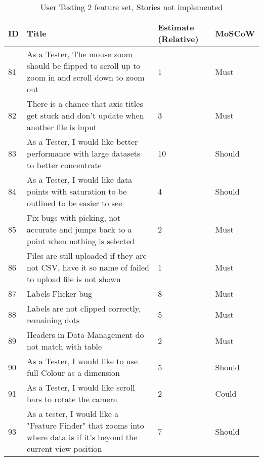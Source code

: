 \begin{table*}[hbt!]
    \begin{tabularx}{\textwidth}{ | X | X | X | X | }
        \hline
        ID & Title                                                                                                               & Estimate (Relative) & MoSCoW \\
        \hline
        81 & As a Tester, The mouse zoom should be flipped to scroll up to zoom in and scroll down to zoom out                   & 1                   & Must   \\
        \hline
        82 & There is a chance that axis titles get stuck and don't update when another file is input                            & 3                   & Must   \\
        \hline
        83 & As a Tester, I would like better performance with large datasets to better concentrate                              & 10                  & Should \\
        \hline
        84 & As a Tester, I would like data points with saturation to be outlined to be easier to see                            & 4                   & Should \\
        \hline
        85 & Fix bugs with picking, not accurate and jumps back to a point when nothing is selected                              & 2                   & Must   \\
        \hline
        86 & Files are still uploaded if they are not CSV, have it so name of failed to upload file is not shown                 & 1                   & Must   \\
        \hline
        87 & Labels Flicker bug                                                                                                  & 8                   & Must   \\
        \hline
        88 & Labels are not clipped correctly, remaining dots                                                                    & 5                   & Must   \\
        \hline
        89 & Headers in Data Management do not match with table                                                                  & 2                   & Must   \\
        \hline
        90 & As a Tester, I would like to use full Colour as a dimension                                                         & 5                   & Should \\
        \hline
        91 & As a Tester, I would like scroll bars to rotate the camera                                                          & 2                   & Could  \\
        \hline
        93 & As a tester, I would like a "Feature Finder" that zooms into where data is if it's beyond the current view position & 7                   & Should \\
        \hline
    \end{tabularx}
    \caption{User Testing 2 feature set, Stories not implemented}
    \label{UT2}
\end{table*}
